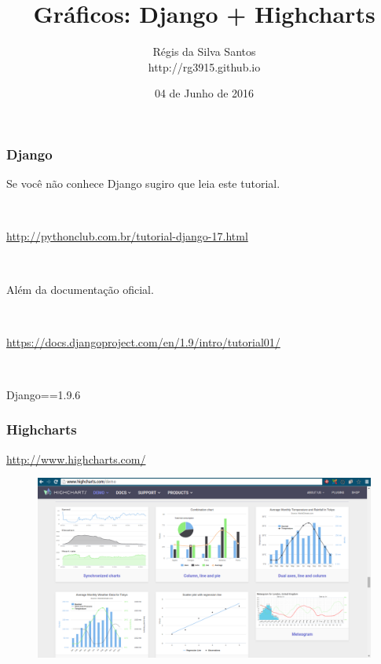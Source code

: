 \documentclass[aspectratio=169]{beamer}
\title{Gráficos: Django + Highcharts}
\author{R\'egis da Silva Santos\\ {\texorpdfstring{\color{blue}}{ }http://rg3915.github.io}}
\institute{\url{github.com/grupy-sp/encontros}}
\date{04 de Junho de 2016}
\begin{document}
\justifying %

{%




\begin{frame}
	\titlepage
\end{frame}

\begin{frame}\frametitle{Django}
Se você não conhece Django sugiro que leia este tutorial.

\

\url{http://pythonclub.com.br/tutorial-django-17.html}

\

Além da documentação oficial.

\

\url{https://docs.djangoproject.com/en/1.9/intro/tutorial01/}

\

\begin{center}
    \large Django==1.9.6
\end{center}
\end{frame}

\begin{frame}\frametitle{Highcharts}

    \begin{center}
        \url{http://www.highcharts.com/}
    \end{center}

    \begin{figure}[h]
      \centering
        \includegraphics[width=.8\paperwidth]{img/demo.png}
    \end{figure}


\end{frame}}
\end{document}
